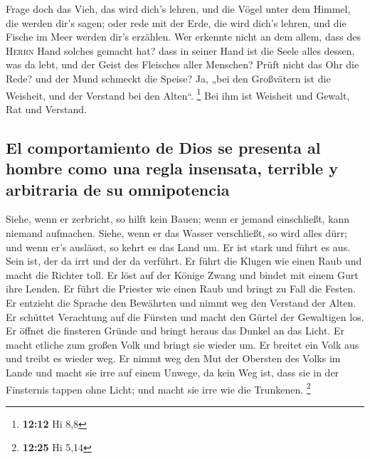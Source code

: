  Frage doch das Vieh, das wird dich's lehren, und die
Vögel unter dem Himmel, die werden dir's sagen;  oder rede
mit der Erde, die wird dich's lehren, und die Fische im Meer werden
dir's erzählen.  Wer erkennte nicht an dem allem, dass des
\textsc{Herrn} Hand solches gemacht hat?  dass in seiner
Hand ist die Seele alles dessen, was da lebt, und der Geist des
Fleisches aller Menschen?  Prüft nicht das Ohr die Rede?
und der Mund schmeckt die Speise?  Ja, „bei den
Großvätern ist die Weisheit, und der Verstand bei den Alten``.
\footnote{\textbf{12:12} Hi 8,8}  Bei ihm ist Weisheit
und Gewalt, Rat und Verstand.

\hypertarget{el-comportamiento-de-dios-se-presenta-al-hombre-como-una-regla-insensata-terrible-y-arbitraria-de-su-omnipotencia}{%
\subsection{El comportamiento de Dios se presenta al hombre como una
regla insensata, terrible y arbitraria de su
omnipotencia}\label{el-comportamiento-de-dios-se-presenta-al-hombre-como-una-regla-insensata-terrible-y-arbitraria-de-su-omnipotencia}}

 Siehe, wenn er zerbricht, so hilft kein Bauen; wenn er
jemand einschließt, kann niemand aufmachen.  Siehe, wenn
er das Wasser verschließt, so wird alles dürr; und wenn er's auslässt,
so kehrt es das Land um.  Er ist stark und führt es aus.
Sein ist, der da irrt und der da verführt.  Er führt die
Klugen wie einen Raub und macht die Richter toll.  Er
löst auf der Könige Zwang und bindet mit einem Gurt ihre Lenden.
 Er führt die Priester wie einen Raub und bringt zu Fall
die Festen.  Er entzieht die Sprache den Bewährten und
nimmt weg den Verstand der Alten.  Er schüttet Verachtung
auf die Fürsten und macht den Gürtel der Gewaltigen los. 
Er öffnet die finsteren Gründe und bringt heraus das Dunkel an das
Licht.  Er macht etliche zum großen Volk und bringt sie
wieder um. Er breitet ein Volk aus und treibt es wieder weg.
 Er nimmt weg den Mut der Obersten des Volks im Lande und
macht sie irre auf einem Unwege, da kein Weg ist,  dass
sie in der Finsternis tappen ohne Licht; und macht sie irre wie die
Trunkenen. \footnote{\textbf{12:25} Hi 5,14}

